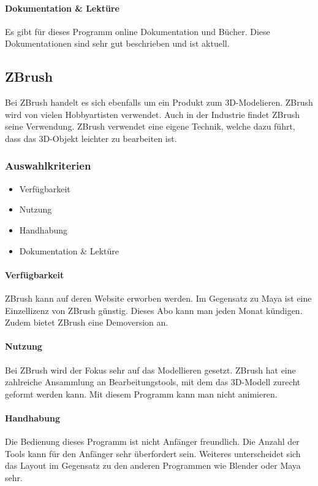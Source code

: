 \paragraph{Dokumentation \& Lektüre}
Es gibt für dieses Programm online Dokumentation und Bücher. Diese Dokumentationen sind sehr gut beschrieben und ist aktuell.

\pagebreak

\subsection{ZBrush}
Bei ZBrush handelt es sich ebenfalls um ein Produkt zum 3D-Modelieren. ZBrush wird von vielen Hobbyartisten verwendet. Auch in der Industrie findet ZBrush seine Verwendung. ZBrush verwendet eine eigene Technik, welche dazu führt, dass das 3D-Objekt leichter zu bearbeiten ist.

\subsubsection{Auswahlkriterien}
\begin{itemize}
    \item Verfügbarkeit
    \item Nutzung
    \item Handhabung
    \item Dokumentation \& Lektüre
\end{itemize}

\paragraph{Verfügbarkeit}
ZBrush kann auf deren Website erworben werden. Im Gegensatz zu Maya ist eine Einzellizenz von ZBrush günstig. Dieses Abo kann man jeden Monat kündigen. Zudem bietet ZBrush eine Demoversion an.

\paragraph{Nutzung}
Bei ZBrush wird der Fokus sehr auf das Modellieren gesetzt. ZBrush hat eine zahlreiche Ansammlung an Bearbeitungstools, mit dem das 3D-Modell zurecht geformt werden kann. Mit diesem Programm kann man nicht animieren.

\paragraph{Handhabung}
Die Bedienung dieses Programm ist nicht Anfänger freundlich. Die Anzahl der Tools kann für den Anfänger sehr überfordert sein. Weiteres unterscheidet sich das Layout im Gegensatz zu den anderen Programmen wie Blender oder Maya sehr.

